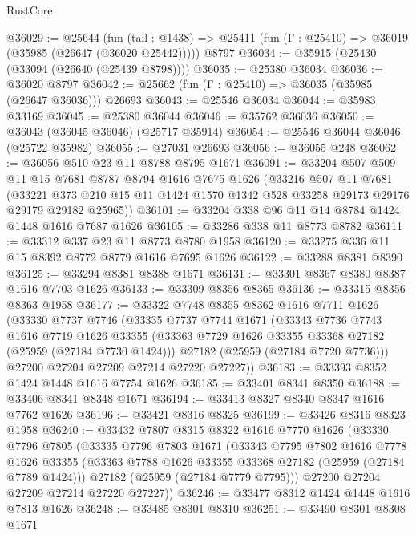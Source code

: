 \begin{lexlean}{RustCore}
\begin{coremodule}
@36029 := @25644
    (fun (tail : @1438) => @25411 (fun (Γ : @25410) => @36019 (@35985 (@26647 (@36020 @25442)))))
    @8797
@36034 := @35915 (@25430 (@33094 (@26640 (@25439 @8798))))
@36035 := @25380 @36034
@36036 := @36020 @8797
@36042 := @25662 (fun (Γ : @25410) => @36035 (@35985 (@26647 @36036))) @26693
@36043 := @25546 @36034
@36044 := @35983 @33169
@36045 := @25380 @36044
@36046 := @35762 @36036
@36050 := @36043 (@36045 @36046) (@25717 @35914)
@36054 := @25546 @36044 @36046 (@25722 @35982)
@36055 := @27031 @26693
@36056 := @36055 @248
@36062 := @36056 @510 @23 @11 @8788 @8795 @1671
@36091 := @33204
    @507
    @509
    @11
    @15
    @7681
    @8787
    @8794
    @1616
    @7675
    @1626
    (@33216
      @507
      @11
      @7681
      (@33221 @373 @210 @15 @11 @1424 @1570 @1342 @528 @33258 @29173 @29176 @29179 @29182 @25965))
@36101 := @33204 @338 @96 @11 @14 @8784 @1424 @1448 @1616 @7687 @1626
@36105 := @33286 @338 @11 @8773 @8782
@36111 := @33312 @337 @23 @11 @8773 @8780 @1958
@36120 := @33275 @336 @11 @15 @8392 @8772 @8779 @1616 @7695 @1626
@36122 := @33288 @8381 @8390
@36125 := @33294 @8381 @8388 @1671
@36131 := @33301 @8367 @8380 @8387 @1616 @7703 @1626
@36133 := @33309 @8356 @8365
@36136 := @33315 @8356 @8363 @1958
@36177 := @33322
    @7748
    @8355
    @8362
    @1616
    @7711
    @1626
    (@33330
      @7737
      @7746
      (@33335
        @7737
        @7744
        @1671
        (@33343
          @7736
          @7743
          @1616
          @7719
          @1626
          @33355
          (@33363 @7729 @1626 @33355 @33368 @27182 (@25959 (@27184 @7730 @1424)))
          @27182
          (@25959 (@27184 @7720 @7736)))
        @27200
        @27204
        @27209
        @27214
        @27220
        @27227))
@36183 := @33393 @8352 @1424 @1448 @1616 @7754 @1626
@36185 := @33401 @8341 @8350
@36188 := @33406 @8341 @8348 @1671
@36194 := @33413 @8327 @8340 @8347 @1616 @7762 @1626
@36196 := @33421 @8316 @8325
@36199 := @33426 @8316 @8323 @1958
@36240 := @33432
    @7807
    @8315
    @8322
    @1616
    @7770
    @1626
    (@33330
      @7796
      @7805
      (@33335
        @7796
        @7803
        @1671
        (@33343
          @7795
          @7802
          @1616
          @7778
          @1626
          @33355
          (@33363 @7788 @1626 @33355 @33368 @27182 (@25959 (@27184 @7789 @1424)))
          @27182
          (@25959 (@27184 @7779 @7795)))
        @27200
        @27204
        @27209
        @27214
        @27220
        @27227))
@36246 := @33477 @8312 @1424 @1448 @1616 @7813 @1626
@36248 := @33485 @8301 @8310
@36251 := @33490 @8301 @8308 @1671

\end{coremodule}
\end{lexlean}
